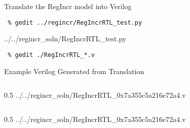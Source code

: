 \begin{task}\begin{frame}[fragile]{Translate the RegIncr model into Verilog}

\vspace{-0.15in}
\begin{Verbatim}[commandchars=\\\{\}]
 % cd \midtilde/pymtl-tut/build
 % gedit ../regincr/RegIncrRTL_test.py
\end{Verbatim}
\vspace{-0.2in}

%
{../../regincr_soln/RegIncrRTL_test.py}

\vspace{-0.22in}
\begin{Verbatim}[commandchars=\\\{\}]
 % py.test ../regincr/RegIncrRTL_test.py -v --test-verilog
 % gedit ./RegIncrRTL_*.v
\end{Verbatim}

\end{frame}
\end{task}

\begin{frame}[fragile]{Example Verilog Generated from Translation}

\vspace{-0.25in}
\begin{cbxcols}

\begin{column}{0.5\tw}
%
{../../regincr_soln/RegIncrRTL_0x7a355c5a216e72a4.v}
\end{column}

\begin{column}{0.5\tw}
%
{../../regincr_soln/RegIncrRTL_0x7a355c5a216e72a4.v}
\end{column}

\end{cbxcols}
\end{frame}

